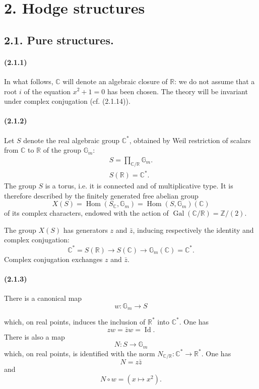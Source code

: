 \documentclass[10pt]{article}
\newcommand{\C}{\mathbb C}
\newcommand{\Z}{\mathbb Z}
\newcommand{\Hom}{\operatorname{Hom}}
\newcommand{\R}{\mathbb R}
\newcommand{\Gm}{\mathbb G_m}
\newcommand{\Gal}{\operatorname{Gal}}
\begin{document}
\section*{2. Hodge structures}
\subsection*{2.1. Pure structures.}

\paragraph{(2.1.1)} In what follows, $\C$ will denote an algebraic closure of $\R$: we do not assume that a root $i$ of the equation $x^2+1=0$ has been chosen. The theory will be invariant under complex conjugation (cf. (2.1.14)).

\paragraph{(2.1.2)} Let $S$ denote the real algebraic group $\C^*$, obtained by Weil restriction of scalars from $\C$ to $\R$ of the group $\Gm$:
\[
\begin{gathered}
S=\prod_{\C/\R}\Gm.\\
S(\R)=\C^*.
\end{gathered}
\]
The group $S$ is a torus, i.e. it is connected and of multiplicative type. It is therefore described by the finitely generated free abelian group
\[
X(S)=\Hom(S_\C,\Gm)=\Hom(S,\Gm)(\C)
\]
of its complex characters, endowed with the action of $\Gal(\C/\R)=\Z/(2)$.

The group $X(S)$ has generators $z$ and $\bar z$, inducing respectively the identity and complex conjugation:
\[
\C^*=S(\R)\longrightarrow S(\C)\longrightarrow \Gm(\C)=\C^*.
\]
Complex conjugation exchanges $z$ and $\bar z$.

\paragraph{(2.1.3)} There is a canonical map
\[
\tag{2.1.3.1}
w:\Gm\longrightarrow S
\]




which, on real points, induces the inclusion of $\R^*$ into $\C^*$. One has
\[
\tag{2.1.3.2}
z w=\bar z w=\operatorname{Id}.
\]
There is also a map
\[
\tag{2.1.3.3}
N:S\longrightarrow\Gm
\]
which, on real points, is identified with the norm $N_{\C/\R}:\C^*\to\R^*$. One has
\[
\tag{2.1.3.4}
N=z\bar z
\]
and
\[
\tag{2.1.3.5}
N\circ w=(x\mapsto x^2).
\]
\end{document}
